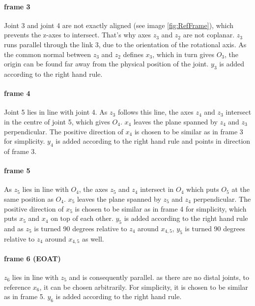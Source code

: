 \paragraph{frame 3}
Joint 3 and joint 4 are not exactly aligned (see image \ref{fig:RefFrame}), which prevents the z-axes to intersect. That's why axes $z_3$ and $z_2$ are not coplanar. 
$z_3$ runs parallel through the link 3, due to the orientation of the rotational axis.
As the common normal between $z_3$ and $z_2$ defines $x_3$, which in turn gives $O_3$, the origin can be found far away from the physical position of the joint.
$y_3$ is added according to the right hand rule.

\paragraph{frame 4}
Joint 5 lies in line with joint 4.
As $z_3$ follows this line, the axes  $z_4$ and $z_3$ intersect in the centre of joint 5, which gives $O_4$. 
$x_4$ leaves the plane spanned by  $z_4$ and $z_3$ perpendicular.
The positive direction of $x_4$ is chosen to be similar as in frame 3 for simplicity.
$y_4$ is added according to the right hand rule and points in direction of frame 3.

\paragraph{frame 5}
As $z_5$ lies  in line with $O_4$, the axes  $z_5$ and $z_4$ intersect in $O_4$ which puts $O_5$ at the same position as $O_4$.
$x_5$ leaves the plane spanned by  $z_5$ and $z_4$ perpendicular.
The positive direction of $x_5$ is chosen to be similar as in frame 4 for simplicity, which puts $x_5$ and $x_4$ on top of each other. 
$y_5$ is added according to the right hand rule and as $z_5$ is turned 90 degrees relative to $z_4$ around $x_{4,5}$, $y_5$ is turned 90 degrees relative to $z_4$ around $x_{4,5}$ as well.

\paragraph{frame 6 (EOAT)}
$z_6$ lies in line with $z_5$ and is consequently parallel.
as there are no distal joints, to reference $x_6$, it can be chosen arbitrarily. 
For simplicity, it is chosen to be similar as in frame 5. 
$y_6$ is added according to the right hand rule.\\
\\

